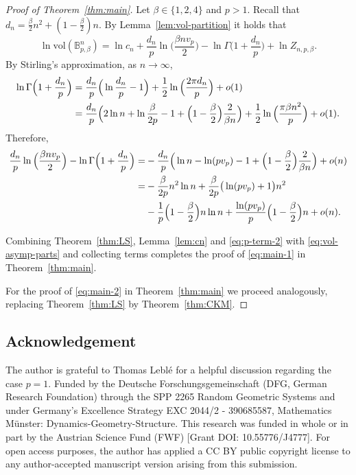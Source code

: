 \documentclass[a4paper,12pt,reqno]{amsart}
\theoremstyle{definition}
\newcommand{\vol}{\mathrm{vol}}
\newcommand{\bpb}{\mathbb{B}_{p,\beta}^n}
\begin{document}
\begin{proof}[Proof of Theorem~\ref{thm:main}]
Let $\beta\in \{1,2,4\}$ and $p>1$. Recall that $d_n=\frac{\beta}{2}n^2+(1-\frac{\beta}{2})n$. By Lemma~\ref{lem:vol-partition} it holds that
\begin{equation} \label{eq:vol-asymp-parts}
\ln \vol(\bpb)
=\ln c_{n}+\frac{d_n}{p}\ln \Big(\frac{\beta nv_p}{2}\Big)-\ln \Gamma\Big(1+\frac{d_n}{p}\Big)+\ln Z_{n,p,\beta}.
\end{equation}
By Stirling's approximation, as $n\to\infty$,
\begin{align}\label{eq:p-term-1}
\ln \Gamma\Big(1+\frac{d_n}{p}\Big)
&=\frac{d_n}{p}\Big(\ln \frac{d_n}{p}-1\Big)+\frac{1}{2}\ln\Big(\frac{2\pi d_n}{p}\Big)+o(1)\notag\\
&=\frac{d_n}{p}\Big(2\ln n+\ln \frac{\beta}{2p}-1+\Big(1-\frac{\beta}{2}\Big)\frac{2}{\beta n}\Big)+\frac{1}{2}\ln\Big(\frac{\pi \beta n^2}{p}\Big)+o(1).
\end{align}
Therefore, 
\begin{align}\label{eq:p-term-2}
\frac{d_n}{p}\ln\Big(\frac{\beta n v_p}{2}\Big)
-\ln \Gamma\Big(1+\frac{d_n}{p}\Big)
=&-\frac{d_n}{p}\Big(\ln n -\ln(p v_p)-1+\Big(1-\frac{\beta}{2}\Big)\frac{2}{\beta n}\Big)+o(n)\notag\\
=&-\frac{\beta}{2p}n^2\ln n+\frac{\beta}{2p}\big(\ln(pv_p)+1\big)n^2\notag\\
&-\frac{1}{p}\Big(1-\frac{\beta}{2}\Big)n\ln n+\frac{\ln(pv_p)}{p}\Big(1-\frac{\beta}{2}\Big)n +o(n).
\end{align}

Combining Theorem~\ref{thm:LS}, Lemma~\ref{lem:cn} and \eqref{eq:p-term-2} with \eqref{eq:vol-asymp-parts} and collecting terms completes the proof of \eqref{eq:main-1} in Theorem~\ref{thm:main}.

For the proof of \eqref{eq:main-2} in Theorem~\ref{thm:main} we proceed analogously, replacing Theorem~\ref{thm:LS} by Theorem~\ref{thm:CKM}.
\end{proof}

\subsection*{Acknowledgement}

The author is grateful to Thomas Lebl\'e for a helpful discussion regarding the case $p=1$. Funded by the Deutsche Forschungsgemeinschaft (DFG, German Research Foundation) through the SPP 2265 Random Geometric Systems and under Germany's Excellence Strategy EXC 2044/2 - 390685587, Mathematics Münster: Dynamics-Geometry-Structure. This research was funded in whole or in part by the Austrian Science Fund (FWF) [Grant DOI: 10.55776/J4777]. For open access purposes, the author has applied a CC BY public copyright license to any author-accepted manuscript version arising from this submission. 




\end{document}
